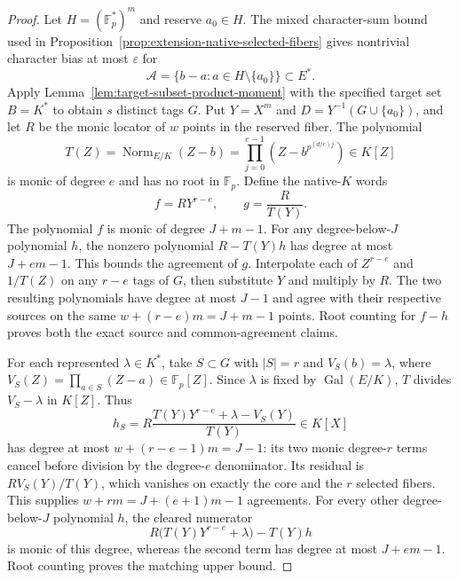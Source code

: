 \begin{proof}
Let $H=(\mathbb F_p^*)^m$ and reserve $a_0\in H$.
The mixed character-sum bound used in
Proposition~\ref{prop:extension-native-selected-fibers} gives
nontrivial character bias at most $\varepsilon$ for
\[
 \mathcal A=\{b-a:a\in H\setminus\{a_0\}\}\subset E^*.
\]
Apply Lemma~\ref{lem:target-subset-product-moment} with the
specified target set $B=K^*$ to obtain $s$ distinct tags $G$.
Put $Y=X^m$ and $D=Y^{-1}(G\cup\{a_0\})$, and let $R$ be the
monic locator of $w$ points in the reserved fiber.  The polynomial
\[
 T(Z)=\operatorname{Norm}_{E/K}(Z-b)
     =\prod_{j=0}^{e-1}(Z-b^{p^{(d/e)j}})\in K[Z]
\]
is monic of degree $e$ and has no root in $\mathbb F_p$.
Define the native-$K$ words
\[
 f=R Y^{r-e},\qquad g=\frac R{T(Y)}.
\]
The polynomial $f$ is monic of degree $J+m-1$.
For any degree-below-$J$ polynomial $h$, the nonzero polynomial
$R-T(Y)h$ has degree at most $J+em-1$.  This bounds the agreement
of $g$.  Interpolate each of $Z^{r-e}$ and $1/T(Z)$ on any
$r-e$ tags of $G$, then substitute $Y$ and multiply by $R$.
The two resulting polynomials have degree at most $J-1$ and agree
with their respective sources on the same $w+(r-e)m=J+m-1$
points.  Root counting for $f-h$ proves both the exact source and
common-agreement claims.

For each represented $\lambda\in K^*$, take $S\subset G$ with
$|S|=r$ and $V_S(b)=\lambda$, where
$V_S(Z)=\prod_{a\in S}(Z-a)\in\mathbb F_p[Z]$.
Since $\lambda$ is fixed by $\operatorname{Gal}(E/K)$,
$T$ divides $V_S-\lambda$ in $K[Z]$.  Thus
\[
 h_S=R\frac{T(Y)Y^{r-e}+\lambda-V_S(Y)}{T(Y)}\in K[X]
\]
has degree at most $w+(r-e-1)m=J-1$: its two monic degree-$r$
terms cancel before division by the degree-$e$ denominator.
Its residual is $RV_S(Y)/T(Y)$, which vanishes on exactly the
core and the $r$ selected fibers.  This supplies
$w+rm=J+(e+1)m-1$ agreements.  For every other degree-below-$J$
polynomial $h$, the cleared numerator
\[
 R\bigl(T(Y)Y^{r-e}+\lambda\bigr)-T(Y)h
\]
is monic of this degree, whereas the second term has degree at
most $J+em-1$.  Root counting proves the matching upper bound.
\end{proof}

